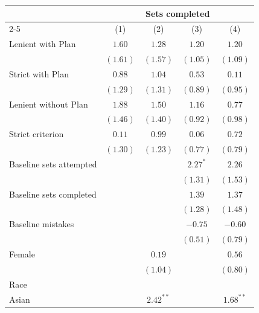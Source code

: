\begin{tabular}{l c c c c}
\toprule
 & \multicolumn{4}{c}{Sets completed} \\
\cmidrule(lr){2-5}
 & (1) & (2) & (3) & (4) \\
\midrule
Lenient with Plan        & $1.60$        & $1.28$        & $1.20$       & $1.20$      \\
                         & $(1.61)$      & $(1.57)$      & $(1.05)$     & $(1.09)$    \\
Strict with Plan         & $0.88$        & $1.04$        & $0.53$       & $0.11$      \\
                         & $(1.29)$      & $(1.31)$      & $(0.89)$     & $(0.95)$    \\
Lenient without Plan     & $1.88$        & $1.50$        & $1.16$       & $0.77$      \\
                         & $(1.46)$      & $(1.40)$      & $(0.92)$     & $(0.98)$    \\
Strict criterion         & $0.11$        & $0.99$        & $0.06$       & $0.72$      \\
                         & $(1.30)$      & $(1.23)$      & $(0.77)$     & $(0.79)$    \\
Baseline sets attempted  &               &               & $2.27^{*}$   & $2.26$      \\
                         &               &               & $(1.31)$     & $(1.53)$    \\
Baseline sets completed  &               &               & $1.39$       & $1.37$      \\
                         &               &               & $(1.28)$     & $(1.48)$    \\
Baseline mistakes        &               &               & $-0.75$      & $-0.60$     \\
                         &               &               & $(0.51)$     & $(0.79)$    \\
Female                   &               & $0.19$        &              & $0.56$      \\
                         &               & $(1.04)$      &              & $(0.80)$    \\
Race                     &               &               &              &             \\
\quad Asian              &               & $2.42^{**}$   &              & $1.68^{**}$ \\

\end{tabular}
